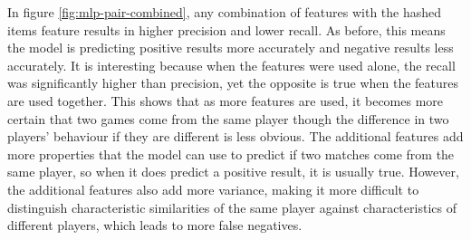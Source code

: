 \documentclass[Report.tex]{subfiles}
\begin{document}
In figure \ref{fig:mlp-pair-combined}, any combination of features with the hashed items feature results in higher precision and lower recall. As before, this means the model is predicting positive results more accurately and negative results less accurately. It is interesting because when the features were used alone, the recall was significantly higher than precision, yet the opposite is true when the features are used together. This shows that as more features are used, it becomes more certain that two games come from the same player though the difference in two players' behaviour if they are different is less obvious. The additional features add more properties that the model can use to predict if two matches come from the same player, so when it does predict a positive result, it is usually true. However, the additional features also add more variance, making it more difficult to distinguish characteristic similarities of the same player against characteristics of different players, which leads to more false negatives. 



\end{document}
